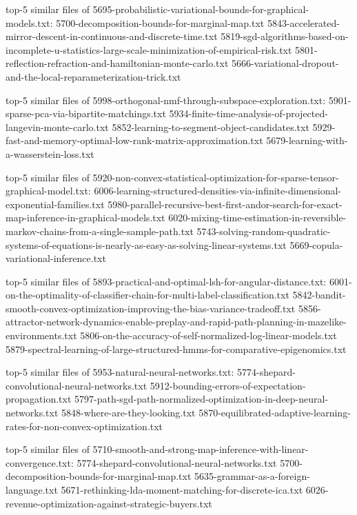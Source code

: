 \documentclass[11pt]{article}
\begin{document}
top-5 similar files of
5695-probabilistic-variational-bounds-for-graphical-models.txt:
5700-decomposition-bounds-for-marginal-map.txt
5843-accelerated-mirror-descent-in-continuous-and-discrete-time.txt
5819-sgd-algorithms-based-on-incomplete-u-statistics-large-scale-minimization-of-empirical-risk.txt
5801-reflection-refraction-and-hamiltonian-monte-carlo.txt
5666-variational-dropout-and-the-local-reparameterization-trick.txt

top-5 similar files of
5998-orthogonal-nmf-through-subspace-exploration.txt:
5901-sparse-pca-via-bipartite-matchings.txt
5934-finite-time-analysis-of-projected-langevin-monte-carlo.txt
5852-learning-to-segment-object-candidates.txt
5929-fast-and-memory-optimal-low-rank-matrix-approximation.txt
5679-learning-with-a-wasserstein-loss.txt

top-5 similar files of
5920-non-convex-statistical-optimization-for-sparse-tensor-graphical-model.txt:
6006-learning-structured-densities-via-infinite-dimensional-exponential-families.txt
5980-parallel-recursive-best-first-andor-search-for-exact-map-inference-in-graphical-models.txt
6020-mixing-time-estimation-in-reversible-markov-chains-from-a-single-sample-path.txt
5743-solving-random-quadratic-systems-of-equations-is-nearly-as-easy-as-solving-linear-systems.txt
5669-copula-variational-inference.txt

top-5 similar files of
5893-practical-and-optimal-lsh-for-angular-distance.txt:
6001-on-the-optimality-of-classifier-chain-for-multi-label-classification.txt
5842-bandit-smooth-convex-optimization-improving-the-bias-variance-tradeoff.txt
5856-attractor-network-dynamics-enable-preplay-and-rapid-path-planning-in-mazelike-environments.txt
5806-on-the-accuracy-of-self-normalized-log-linear-models.txt
5879-spectral-learning-of-large-structured-hmms-for-comparative-epigenomics.txt

top-5 similar files of 5953-natural-neural-networks.txt:
5774-shepard-convolutional-neural-networks.txt
5912-bounding-errors-of-expectation-propagation.txt
5797-path-sgd-path-normalized-optimization-in-deep-neural-networks.txt
5848-where-are-they-looking.txt
5870-equilibrated-adaptive-learning-rates-for-non-convex-optimization.txt

top-5 similar files of
5710-smooth-and-strong-map-inference-with-linear-convergence.txt:
5774-shepard-convolutional-neural-networks.txt
5700-decomposition-bounds-for-marginal-map.txt
5635-grammar-as-a-foreign-language.txt
5671-rethinking-lda-moment-matching-for-discrete-ica.txt
6026-revenue-optimization-against-strategic-buyers.txt
\end{document}
